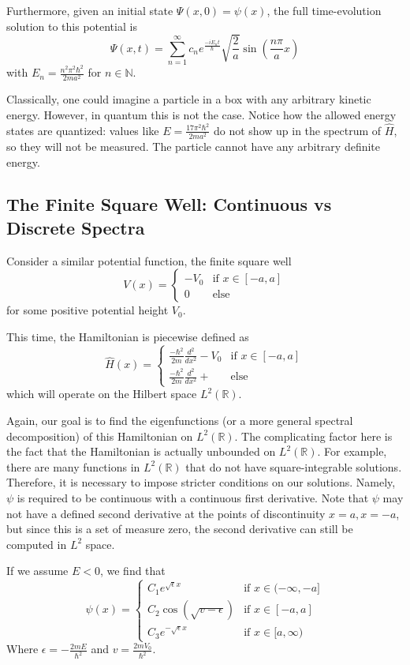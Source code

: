 Furthermore, given an initial state $\Psi(x,0) = \psi(x)$, the full
time-evolution solution to this potential is
\[
    \Psi(x,t) =
    \sum_{n=1}^{\infty} c_n e^{\frac{-iE_nt}{\hbar}}\sqrt{\frac{2}{a}}\sin(\frac{n\pi}{a}x)
\]
with $E_n = \frac{n^2\pi^2\hbar^2}{2ma^2}$ for $n\in \mathbb{N}$.

Classically, one could imagine a particle in a box with any arbitrary kinetic
energy. However, in quantum this is not the case. Notice how the allowed energy
states are quantized: values like $E = \frac{17\pi^2\hbar^2}{2ma^2}$ do not show
up in the spectrum of $\hat{H}$, so they will not be measured. The particle
cannot have any arbitrary definite energy.

\subsection{The Finite Square Well: Continuous vs Discrete Spectra}

Consider a similar potential function, the finite square well
\[
    V(x) =
    \begin{cases}
        -V_0 & \text{if } x\in[-a,a]\\
        0 & \text{else}
    \end{cases}
\]
for some positive potential height $V_0$.

This time, the Hamiltonian is piecewise defined as
\[
    \hat{H}(x) =
    \begin{cases}
        \frac{-\hbar^2}{2m}\frac{d^2}{dx^2} - V_0& \text{if } x\in[-a,a]\\
        \frac{-\hbar^2}{2m}\frac{d^2}{dx^2} + &\text{else}
    \end{cases}
\]
which will operate on the Hilbert space $L^2(\mathbb{R})$.

Again, our goal is to find the eigenfunctions (or a more general spectral
decomposition) of this Hamiltonian on $L^2(\mathbb{R})$.
The complicating factor here is the fact that the Hamiltonian is actually
unbounded on $L^2(\mathbb{R})$. For example, there are many functions in
$L^2(\mathbb{R})$ that do not have square-integrable solutions. Therefore, it is
necessary to impose stricter conditions on our solutions. Namely, $\psi$ is
required to be continuous with a continuous first derivative. Note that $\psi$
may not have a defined second derivative at the points of discontinuity $x=a,
x=-a$, but since this is a set of measure zero, the second derivative can still
be computed in $L^2$ space.

If we assume $E<0$, we find that
\[
    \psi(x) =
    \begin{cases}
        C_1e^{\sqrt{\epsilon}x}& \text{if } x\in(-\infty,-a]\\
        C_2\cos(\sqrt{v-\epsilon})& \text{if } x\in[-a,a]\\
        C_3e^{-\sqrt{\epsilon}x}& \text{if } x\in [a, \infty)
    \end{cases}
\]
Where $\epsilon = -\frac{2mE}{\hbar^2}$ and
$v=\frac{2mV_0}{\hbar^2}$.

